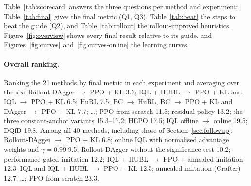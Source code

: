 \documentclass[11pt,a4paper]{article}
\begin{document}
Table~\ref{tab:scorecard} answers the three questions per method and experiment; Table~\ref{tab:final} gives the
final metric (Q1, Q3), Table~\ref{tab:beat} the steps to beat the guide (Q2), and Table~\ref{tab:rollout} the
rollout-improved heuristics. Figure~\ref{fig:overview} shows every final result relative to its guide, and
Figures~\ref{fig:curves} and~\ref{fig:curves-online} the learning curves.

\paragraph{Overall ranking.} Ranking the 21 methods by final metric in each experiment and averaging over the six:
Rollout-DAgger $\to$ PPO + KL 3.3; IQL + HUBL $\to$ PPO + KL and IQL $\to$ PPO + KL 6.5; HuRL 7.5; BC $\to$ HuRL,
BC $\to$ PPO + KL and DAgger $\to$ PPO + KL 7.7; \dots; PPO from scratch 11.5; residual policy 13.2; the three
constant-anchor variants 15.3--17.2; HEPO 17.5; IQL offline $\to$ online 19.5; DQfD 19.8.
Among all 40 methods, including those of Section~\ref{sec:followup}: Rollout-DAgger $\to$ PPO + KL 6.8; online IQL
with normalised advantage weights and $\gamma = 0.99$ 9.5; Rollout-DAgger without the significance test 10.2;
performance-gated imitation 12.2; IQL + HUBL $\to$ PPO + annealed imitation 12.3; IQL and IQL + HUBL $\to$ PPO + KL
12.5; annealed imitation (Crafter) 12.7; \dots; PPO from scratch 23.3.
\end{document}
